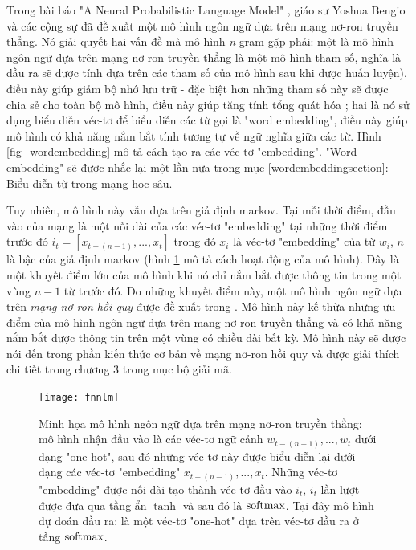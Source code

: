 Trong bài báo "A Neural Probabilistic Language Model" \cite{bengioLM2003}, giáo sư Yoshua Bengio và các cộng sự đã đề xuất một mô hình ngôn ngữ dựa trên mạng nơ-ron truyền thẳng. Nó giải quyết hai vấn đề mà mô hình \textit{n}-gram gặp phải: một là mô hình ngôn ngữ dựa trên mạng nơ-ron truyền thẳng là một mô hình tham số, nghĩa là đầu ra sẽ được tính dựa trên các tham số của mô hình sau khi được huấn luyện), điều này giúp giảm bộ nhớ lưu trữ - đặc biệt hơn những tham số này sẽ được chia sẻ cho toàn bộ mô hình, điều này giúp tăng tính tổng quát hóa \cite{bengioLM2003}; hai là nó sử dụng biểu diễn véc-tơ để biểu diễn các từ gọi là "word embedding", điều này giúp mô hình có khả năng nắm bắt tính tương tự về ngữ nghĩa giữa các từ. Hình \ref{fig_wordembedding} mô tả cách tạo ra các véc-tơ "embedding". "Word embedding" sẽ được nhắc lại một lần nữa trong mục \ref{wordembeddingsection}: Biểu diễn từ trong mạng học sâu.

Tuy nhiên, mô hình này vẫn dựa trên giả định markov. Tại mỗi thời điểm, đầu vào của mạng là một nối dài của các véc-tơ "embedding" tại những thời điểm trước đó $i_t = \left[ x_{t-(n-1)},...,x_t \right]$ trong đó $x_i$ là véc-tơ "embedding" của từ $w_i$, $n$ là bậc của giả định markov (hình \ref{fig_fnnlm} mô tả cách hoạt động của mô hình). Đây là một khuyết điểm lớn của mô hình khi nó chỉ nắm bắt được thông tin trong một vùng $n - 1$ từ trước đó. Do những khuyết điểm này, một mô hình ngôn ngữ dựa trên \textit{mạng nơ-ron hồi quy} được đề xuất trong \cite{mikolovLM}. Mô hình này kế thừa những ưu điểm của mô hình ngôn ngữ dựa trên mạng nơ-ron truyền thẳng và có khả năng nắm bắt được thông tin trên một vùng có chiều dài bất kỳ. Mô hình này sẽ được nói đến trong phần kiến thức cơ bản về mạng nơ-ron hồi quy và được giải thích chi tiết trong chương 3 trong mục bộ giải mã. 

\begin{figure}
	\centering
	\texttt{[image: fnnlm]}
	\caption[Minh họa mô hình ngôn ngữ dựa trên mạng nơ-ron truyền thẳng]{Minh họa mô hình ngôn ngữ dựa trên mạng nơ-ron truyền thẳng: mô hình nhận đầu vào là các véc-tơ ngữ cảnh $w_{t-(n-1)},...,w_t$ dưới dạng "one-hot", sau đó những véc-tơ này được biểu diễn lại dưới dạng các véc-tơ "embedding" $x_{t-(n-1)},...,x_t$. Những véc-tơ "embedding" được nối dài tạo thành véc-tơ đầu vào $i_t$, $i_t$ lần lượt được đưa qua tầng ẩn $\tanh$ và sau đó là $\mathrm{softmax}$. Tại đây mô hình dự đoán đầu ra: là một véc-tơ "one-hot" dựa trên véc-tơ đầu ra ở tầng $\mathrm{softmax}$.}
	\label{fig_fnnlm}
\end{figure}

